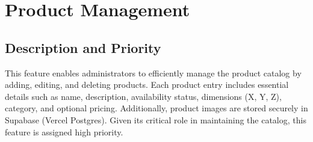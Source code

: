 \documentclass[oneside,a4paper,12pt,explicit]{book}
\begin{document}






\section{Product Management}

\subsection{Description and Priority}
This feature enables administrators to efficiently manage the product catalog by adding, editing, and deleting products. Each product entry includes essential details such as name, description, availability status, dimensions (X, Y, Z), category, and optional pricing. Additionally, product images are stored securely in Supabase (Vercel Postgres). Given its critical role in maintaining the catalog, this feature is assigned high priority.
\end{document}
